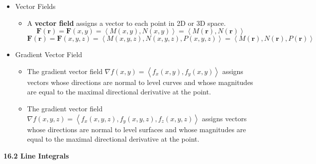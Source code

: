 \documentclass[12pt]{article}
\renewcommand{\vec}[1]{\mathbf{#1}}
\newcommand{\<}{\left<}
\renewcommand{\>}{\right>}
\begin{document}
  \begin{itemize}

  \item Vector Fields
    \begin{itemize}
    \item A \textbf{vector field} assigns a vector to each point in 2D or 3D space.
    \[
      \vec{F}(\vec{r})=\vec{F}(x,y)=\<M(x,y),N(x,y)\>=\<M(\vec{r}),N(\vec{r})\>
    \]
    \[
      \vec{F}(\vec{r})=\vec{F}(x,y,z)=\<M(x,y,z),N(x,y,z),P(x,y,z)\>=\<M(\vec{r}),N(\vec{r}),P(\vec{r})\>
    \]
    \end{itemize}

  \item Gradient Vector Field
    \begin{itemize}
    \item The gradient vector field $\nabla f(x,y)=\<f_x(x,y),f_y(x,y)\>$ assigns vectors whose directions are normal to level curves and whose magnitudes are equal to the maximal directional derivative at the point.
    \item The gradient vector field $\nabla f(x,y,z)=\<f_x(x,y,z),f_y(x,y,z),f_z(x,y,z)\>$ assigns vectors whose directions are normal to level surfaces and whose magnitudes are equal to the maximal directional derivative at the point. 
    \end{itemize}

  \end{itemize}

\newpage

\centerline{\bf 16.2 Line Integrals}
\end{document}
